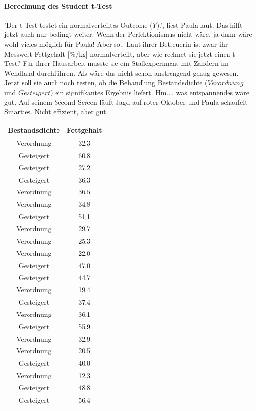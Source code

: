 \documentclass[a4paper, 9pt]{scrartcl}\usepackage[]{graphicx}\usepackage[]{xcolor}
\begin{document}
\paragraph{Berechnung des Student t-Test}

'Der t-Test testet ein normalverteiltes Outcome ($Y$).', liest Paula laut. Das hilft jetzt auch nur bedingt weiter. Wenn der Perfektionismus nicht wäre, ja dann wäre wohl vieles möglich für Paula! Aber so.. Laut ihrer Betreuerin ist zwar ihr Messwert Fettgehalt [\%/kg] normalverteilt, aber wie rechnet sie jetzt einen t-Test? Für ihrer Hausarbeit musste sie ein Stallexperiment mit Zandern im Wendland durchführen. Als wäre das nicht schon anstrengend genug gewesen. Jetzt soll sie auch noch testen, ob die Behandlung Bestandsdichte ($Verordnung$ und $Gesteigert$) ein signifikantes Ergebnis liefert. Hm..., was entspannendes wäre gut. Auf seinem Second Screen läuft Jagd auf roter Oktober und Paula schaufelt Smarties. Nicht effizient, aber gut.

\begin{table}[!h]
\centering
\begin{tabular}{cc}
\toprule
Bestandsdichte & Fettgehalt\\
\midrule
Verordnung & 32.3\\
Gesteigert & 60.8\\
Gesteigert & 27.2\\
Gesteigert & 36.3\\
Verordnung & 36.5\\
\addlinespace
Verordnung & 34.8\\
Gesteigert & 51.1\\
Verordnung & 29.7\\
Verordnung & 25.3\\
Verordnung & 22.0\\
\addlinespace
Gesteigert & 47.0\\
Gesteigert & 44.7\\
Verordnung & 19.4\\
Gesteigert & 37.4\\
Verordnung & 36.1\\
\addlinespace
Gesteigert & 55.9\\
Verordnung & 32.9\\
Verordnung & 20.5\\
Gesteigert & 40.0\\
Verordnung & 12.3\\
\addlinespace
Gesteigert & 48.8\\
Gesteigert & 56.4\\
\bottomrule
\end{tabular}
\end{table}
\end{document}
